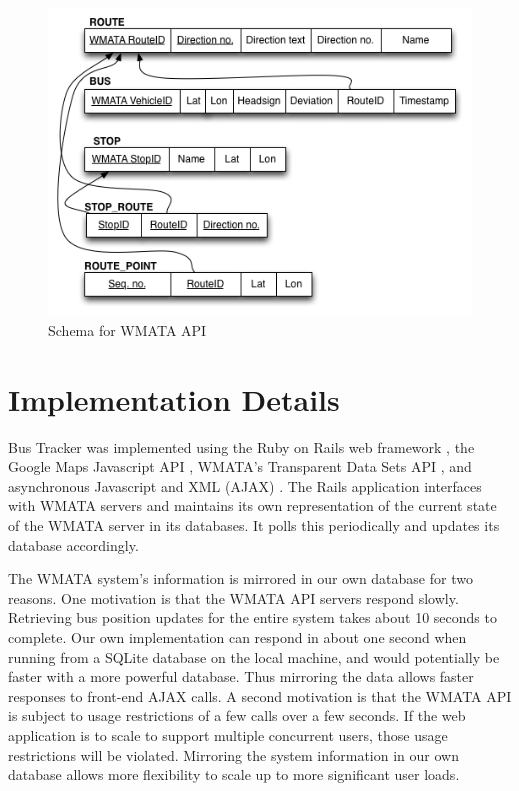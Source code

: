 \documentclass[12pt]{report}
\begin{document}
\begin{figure}[ht]
  \centerline{\includegraphics[scale=0.6]{bus-schema.png}}
  \caption{Schema for WMATA API}
  \label{fig:busSchema}
\end{figure}


\chapter{Implementation Details}

Bus Tracker was implemented using the Ruby on Rails web framework \cite{rails}, the Google Maps Javascript API \cite{web:google-maps}, WMATA's Transparent Data Sets API \cite{web:wmata-api}, and asynchronous Javascript and XML (AJAX) \cite{wiki:ajax}.  The Rails application interfaces with WMATA servers and maintains its own representation of the current state of the WMATA server in its databases.  It polls this periodically and updates its database accordingly.

The WMATA system's information is mirrored in our own database for two reasons.  One motivation is that the WMATA API servers respond slowly.  Retrieving bus position updates for the entire system takes about 10 seconds to complete.  Our own implementation can respond in about one second when running from a SQLite database on the local machine, and would potentially be faster with a more powerful database.  Thus mirroring the data allows faster responses to front-end AJAX calls.  A second motivation is that the WMATA API is subject to usage restrictions of a few calls over a few seconds.  If the web application is to scale to support multiple concurrent users, those usage restrictions will be violated.  Mirroring the system information in our own database allows more flexibility to scale up to more significant user loads. 
\end{document}
